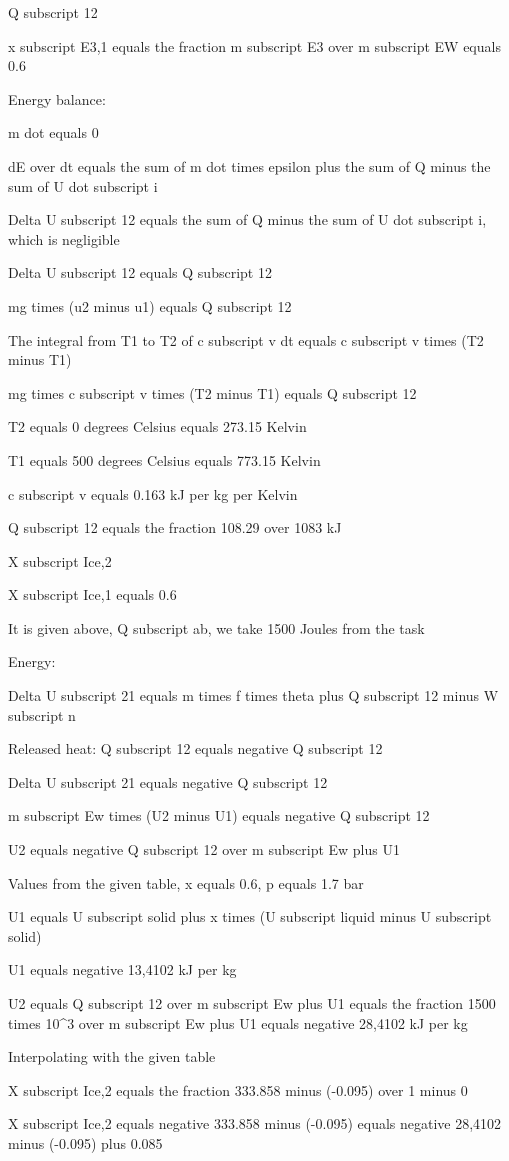 Q subscript 12

x subscript E3,1 equals the fraction m subscript E3 over m subscript EW equals 0.6

Energy balance:

m dot equals 0

dE over dt equals the sum of m dot times epsilon plus the sum of Q minus the sum of U dot subscript i

Delta U subscript 12 equals the sum of Q minus the sum of U dot subscript i, which is negligible

Delta U subscript 12 equals Q subscript 12

mg times (u2 minus u1) equals Q subscript 12

The integral from T1 to T2 of c subscript v dt equals c subscript v times (T2 minus T1)

mg times c subscript v times (T2 minus T1) equals Q subscript 12

T2 equals 0 degrees Celsius equals 273.15 Kelvin

T1 equals 500 degrees Celsius equals 773.15 Kelvin

c subscript v equals 0.163 kJ per kg per Kelvin

Q subscript 12 equals the fraction 108.29 over 1083 kJ

X subscript Ice,2

X subscript Ice,1 equals 0.6

It is given above, Q subscript ab, we take 1500 Joules from the task

Energy:

Delta U subscript 21 equals m times f times theta plus Q subscript 12 minus W subscript n

Released heat: Q subscript 12 equals negative Q subscript 12

Delta U subscript 21 equals negative Q subscript 12

m subscript Ew times (U2 minus U1) equals negative Q subscript 12

U2 equals negative Q subscript 12 over m subscript Ew plus U1

Values from the given table, x equals 0.6, p equals 1.7 bar

U1 equals U subscript solid plus x times (U subscript liquid minus U subscript solid)

U1 equals negative 13,4102 kJ per kg

U2 equals Q subscript 12 over m subscript Ew plus U1 equals the fraction 1500 times 10^3 over m subscript Ew plus U1 equals negative 28,4102 kJ per kg

Interpolating with the given table

X subscript Ice,2 equals the fraction 333.858 minus (-0.095) over 1 minus 0

X subscript Ice,2 equals negative 333.858 minus (-0.095) equals negative 28,4102 minus (-0.095) plus 0.085